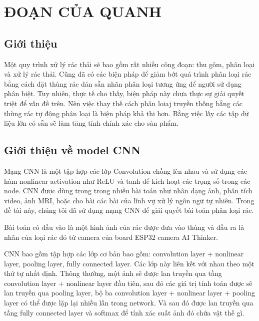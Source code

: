 

\chapter{ĐOẠN CỦA QUANH}
\section{Giới thiệu}
Một quy trình xử lý rác thải sẽ bao gồm rất nhiều công đoạn: thu gôm, phân loại và xử lý rác thải.
Cũng đã có các biện pháp để giảm bớt quá trình phân loại rác bằng cách đặt thùng rác dán sẵn nhãn phân loại tương ứng để người sử dụng phân biệt.
Tuy nhiên, thực tế cho thấy, biện pháp này chưa thực sự giải quyết triệt để vấn đề trên. 
Nên việc thay thế cách phân loiaj truyền thống bằng các thùng rác tự động phân loại là biện pháp khả thi hơn.
Bằng việc lấy các tập dữ liệu lớn có sẵn sẽ làm tăng tính chính xác cho sản phẩm. 

\section{Giới thiệu về model CNN}
Mạng CNN là một tập hợp các lớp Convolution chồng lên nhau và sử dụng các hàm nonlinear activation như ReLU và tanh để kích hoạt các trọng số trong các node. 
CNN được dùng trong trong nhiều bài toán như nhân dạng ảnh, phân tích video, ảnh MRI, hoặc cho bài các bài của lĩnh vự xử lý ngôn ngữ tự nhiên. Trong đề tài này, chúng tôi đã sử dụng mạng CNN để giải quyết bài toán phân loại rác.

Bài toán có đầu vào là một hình ảnh của rác được đưa vào thùng và đầu ra là nhãn của loại rác đó từ camera của board ESP32 camera AI Thinker.

CNN bao gồm tập hợp các lớp cơ bản bao gồm: convolution layer + nonlinear layer, pooling layer, fully connected layer. 
Các lớp này liên kết với nhau theo một thứ tự nhất định. Thông thường, một ảnh sẽ được lan truyền qua tầng convolution layer + nonlinear layer đầu tiên, sau đó các giá trị tính toán được sẽ lan truyền qua pooling layer, bộ ba convolution layer + nonlinear layer + pooling layer có thể được lặp lại nhiều lần trong network. Và sau đó được lan truyền qua tầng fully connected layer và softmax để tính xác suất ảnh đó chứa vật thế gì.


